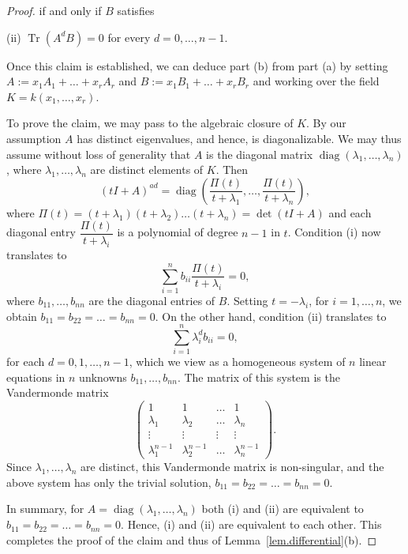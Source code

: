 \documentclass[12pt]{amsart}
\numberwithin{equation}{section}
\numberwithin{subsection}{section}
\theoremstyle{definition} \newtheorem{definition}[theorem]{Definition}
\newcommand\diag{\operatorname{diag}}
\newcommand{\tr}{\operatorname{Tr}}
\begin{document}
\begin{proof}
\smallskip
\noindent
if and only if $B$ satisfies 

\smallskip
(ii) $\tr(A^d B ) = 0$ 
for every $d = 0, \dots, n-1$.

\smallskip
Once this claim is established, we can deduce part (b) from part (a)
by setting $A := x_1 A_1 + \dots + x_r A_r$ and 
$B := x_1 B_1 + \dots + x_r B_r$ and working over the field 
$K = k(x_1, \dots, x_r)$.

To prove the claim, we may pass to the algebraic closure of $K$.
By our assumption $A$ has distinct eigenvalues, and hence, 
is diagonalizable.
We may thus assume without loss of generality that 
$A$ is the diagonal matrix $\diag(\lambda_1, \dots, \lambda_n)$,
where $\lambda_1, \dots, \lambda_n$ are distinct elements of $K$.
Then 
\[ (tI + A)^{ad} = \diag(\dfrac{\Pi(t)}{t + \lambda_1}, \dots, 
\dfrac{\Pi(t)}{t + \lambda_n}), \]
where $\Pi(t) = (t + \lambda_1) (t + \lambda_2) \dots (t + \lambda_n) = 
\det(tI + A)$ and each diagonal entry 
$\dfrac{\Pi(t)}{t + \lambda_i}$ is a polynomial of degree $n-1$ in $t$.
Condition (i) now translates to
\[ \sum_{i = 1}^n b_{ii} \dfrac{\Pi(t)}{t + \lambda_i} = 0 , \]
where $b_{11}, \dots, b_{nn}$ are the diagonal entries of $B$.
Setting $t = - \lambda_i$, for $i = 1, \dots, n$,
we obtain $b_{11} = b_{22} = \dots = b_{nn} = 0$.
On the other hand, condition (ii) translates to
\[ \sum_{i = 1}^n \lambda_i^d b_{ii} = 0 , \]
for each $d = 0, 1, \dots, n-1$, which we view as a homogeneous
system of $n$ linear equations in $n$ unknowns $b_{11}, \dots, b_{nn}$. 
The matrix of this system is the Vandermonde matrix
\[ \begin{pmatrix} 1 & 1 & \dots & 1 \\
\lambda_1 & \lambda_2 & \dots & \lambda_n \\
\vdots & \vdots & \vdots & \vdots  \\
\lambda_1^{n-1} & \lambda_2^{n-1} & \dots & \lambda_n^{n-1} 
\end{pmatrix} . \]
Since $\lambda_1, \dots, \lambda_n$ are distinct, this 
Vandermonde matrix
is non-singular, and the above system has only the trivial solution,
$b_{11} = b_{22} = \dots = b_{nn} = 0$. 

In summary, for 
$A = \diag(\lambda_1, \dots, \lambda_n)$ both (i) and (ii) are equivalent
to $b_{11} = b_{22} = \dots = b_{nn} = 0$. Hence, (i) and (ii) are equivalent
to each other. This completes the proof of the claim and thus of 
Lemma~\ref{lem.differential}(b).
\end{proof}
\end{document}
